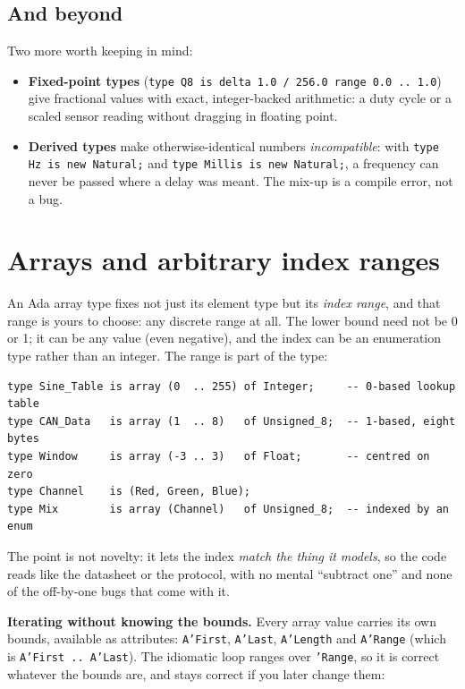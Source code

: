 \subsection{And beyond}

Two more worth keeping in mind:
\begin{itemize}
  \item \textbf{Fixed-point types} (\texttt{type Q8 is delta 1.0 / 256.0 range
        0.0 .. 1.0}) give fractional values with exact, integer-backed
        arithmetic: a duty cycle or a scaled sensor reading without dragging in
        floating point.
  \item \textbf{Derived types} make otherwise-identical numbers
        \emph{incompatible}: with \texttt{type Hz is new Natural;} and
        \texttt{type Millis is new Natural;}, a frequency can never be passed
        where a delay was meant. The mix-up is a compile error, not a bug.
\end{itemize}

\section{Arrays and arbitrary index ranges}
\label{sec:arrays}

An Ada array type fixes not just its element type but its \emph{index range}, and
that range is yours to choose: any discrete range at all. The lower bound need
not be 0 or 1; it can be any value (even negative), and the index can be an
enumeration type rather than an integer. The range is part of the type:

\begin{lstlisting}
type Sine_Table is array (0  .. 255) of Integer;     -- 0-based lookup table
type CAN_Data   is array (1  .. 8)   of Unsigned_8;  -- 1-based, eight bytes
type Window     is array (-3 .. 3)   of Float;       -- centred on zero
type Channel    is (Red, Green, Blue);
type Mix        is array (Channel)   of Unsigned_8;  -- indexed by an enum
\end{lstlisting}

The point is not novelty: it lets the index \emph{match the thing it models}, so
the code reads like the datasheet or the protocol, with no mental ``subtract
one'' and none of the off-by-one bugs that come with it.

\textbf{Iterating without knowing the bounds.} Every array value carries its own
bounds, available as attributes: \texttt{A'First}, \texttt{A'Last},
\texttt{A'Length} and \texttt{A'Range} (which is \texttt{A'First\,..\,A'Last}). The
idiomatic loop ranges over \texttt{'Range}, so it is correct whatever the bounds
are, and stays correct if you later change them:

